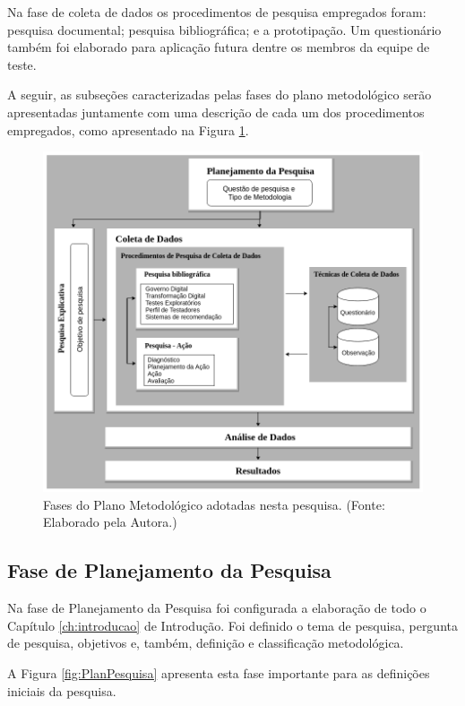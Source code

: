 Na fase de coleta de dados os procedimentos de pesquisa empregados foram: pesquisa documental; pesquisa bibliográfica; e a prototipação. Um questionário também foi elaborado para aplicação futura dentre os membros da equipe de teste.

A seguir, as subseções caracterizadas pelas fases do plano metodológico serão apresentadas juntamente com uma descrição de cada um dos procedimentos empregados, como apresentado na Figura \ref{fig:fasesPlano}.


        \begin{figure}[H]
          \centering
          \includegraphics[width=16cm]{figuras/fasesPlanoMetodologico.png}
          \caption{Fases do Plano Metodológico adotadas nesta pesquisa. (Fonte: Elaborado pela Autora.)}
          \label{fig:fasesPlano}

        \end{figure}


\subsection{Fase de Planejamento da Pesquisa}

Na fase de Planejamento da Pesquisa foi configurada a elaboração de todo o Capítulo \ref{ch:introducao} de Introdução. Foi definido o tema de pesquisa, pergunta de pesquisa, objetivos e, também, definição e classificação metodológica.

A Figura \ref{fig:PlanPesquisa} apresenta esta fase importante para as definições iniciais da pesquisa.

